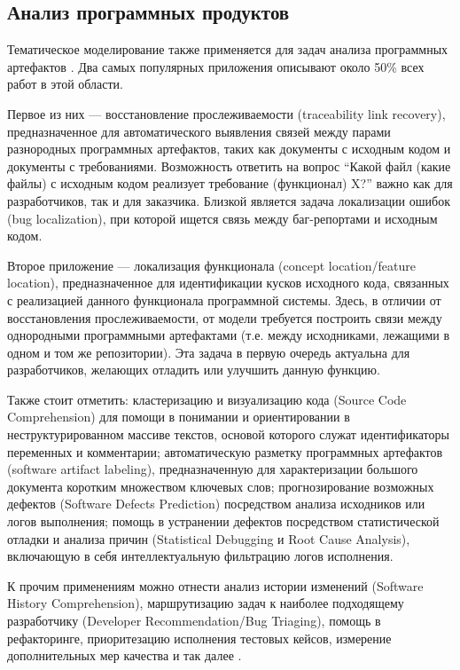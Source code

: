 \subsection{Анализ программных продуктов}

Тематическое моделирование также применяется для задач анализа программных артефактов \cite{sun2016exploring,chen2016survey}. Два самых популярных приложения описывают около 50\% всех работ в этой области\cite{chen2016survey}. 

Первое из них --- восстановление прослеживаемости (traceability link recovery), предназначенное для автоматического выявления связей между парами разнородных программных артефактов, таких как документы с исходным кодом и документы с требованиями\cite{asuncion2010software}. Возможность ответить на вопрос ``Какой файл (какие файлы) с исходным кодом реализует требование (функционал) X?'' важно как для разработчиков, так и для заказчика. Близкой является задача локализации ошибок (bug localization), при которой ищется связь между баг-репортами и исходным кодом.

Второе приложение --- локализация функционала (concept location/feature location), предназначенное для идентификации кусков исходного кода, связанных с реализацией данного функционала программной системы\cite{dit2013feature}. Здесь, в отличии от восстановления прослеживаемости, от модели требуется построить связи между однородными программными артефактами (т.е. между исходниками, лежащими в одном и том же репозитории). Эта задача в первую очередь актуальна для разработчиков, желающих отладить или улучшить данную функцию.

Также стоит отметить: кластеризацию и визуализацию кода  (Source Code Comprehension) для помощи в понимании и ориентировании в неструктурированном массиве текстов, основой которого служат идентификаторы переменных и комментарии; автоматическую разметку программных артефактов (software artifact labeling), предназначенную для характеризации большого документа коротким множеством ключевых слов\cite{de2012using}; прогнозирование возможных дефектов (Software Defects Prediction) посредством анализа исходников или логов выполнения; помощь в  устранении дефектов посредством статистической отладки и анализа причин (Statistical Debugging и Root Cause Analysis), включающую в себя интеллектуальную фильтрацию логов исполнения.

К прочим применениям можно отнести анализ истории изменений (Software History Comprehension), маршрутизацию задач к наиболее подходящему разработчику (Developer Recommendation/Bug Triaging), помощь в рефакторинге, приоритезацию исполнения тестовых кейсов, измерение дополнительных мер качества и так далее \cite{sun2016exploring,chen2016survey}.

